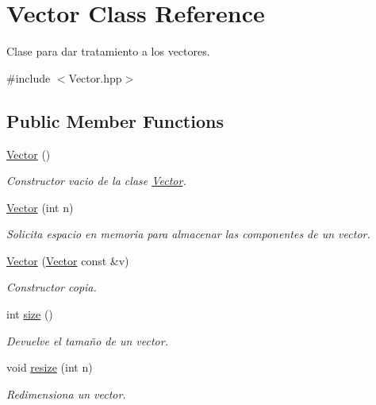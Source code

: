 \hypertarget{class_vector}{}\section{Vector Class Reference}
\label{class_vector}


Clase para dar tratamiento a los vectores.  




{\ttfamily \#include $<$Vector.\+hpp$>$}

\subsection*{Public Member Functions}
\begin{DoxyCompactItemize}
\item 
\hypertarget{class_vector_a6f80c73b5f18dcf3f8e36065bdc8b9e5}{}\label{class_vector_a6f80c73b5f18dcf3f8e36065bdc8b9e5} 
\hyperlink{class_vector_a6f80c73b5f18dcf3f8e36065bdc8b9e5}{Vector} ()
\begin{DoxyCompactList}\small\item\em Constructor vacio de la clase \hyperlink{class_vector}{Vector}. \end{DoxyCompactList}\item 
\hyperlink{class_vector_a96908fb25f0e8236d25650847ee504d5}{Vector} (int n)
\begin{DoxyCompactList}\small\item\em Solicita espacio en memoria para almacenar las componentes de un vector. \end{DoxyCompactList}\item 
\hyperlink{class_vector_af2fe7a700bc95cb634f7dd12c2f11b5e}{Vector} (\hyperlink{class_vector}{Vector} const \&v)
\begin{DoxyCompactList}\small\item\em Constructor copia. \end{DoxyCompactList}\item 
int \hyperlink{class_vector_a93f0b87707399eaa672d93e54c033f7a}{size} ()
\begin{DoxyCompactList}\small\item\em Devuelve el tamaño de un vector. \end{DoxyCompactList}\item 
void \hyperlink{class_vector_a175af2263b569cd6c2b8d3286c02f3a4}{resize} (int n)
\begin{DoxyCompactList}\small\item\em Redimensiona un vector. \end{DoxyCompactList}\item 

\end{DoxyCompactItemize}
